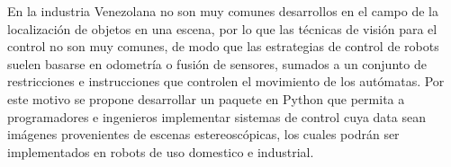 En la industria Venezolana no son muy comunes desarrollos en el campo de la localización de objetos en una escena, por lo que las técnicas de visión para el control no son muy comunes, de modo que las estrategias de control de robots suelen basarse en odometría o fusión de sensores, sumados a un conjunto de restricciones e instrucciones que controlen el movimiento de los autómatas. Por este motivo se propone desarrollar un paquete en Python que permita a programadores e ingenieros implementar sistemas de control cuya data sean imágenes provenientes de escenas estereoscópicas, los cuales podrán ser implementados en robots de uso domestico e industrial.
